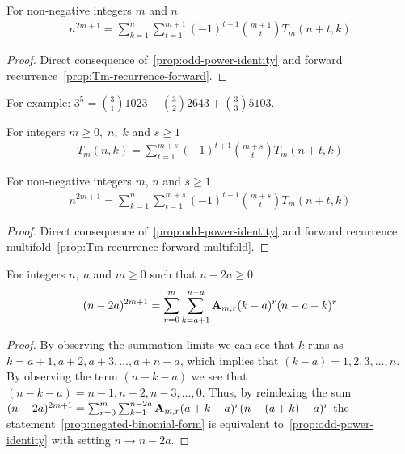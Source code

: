 \begin{proposition}
    \label{prop:odd-power-decomposition-forward}
    For non-negative integers $m$ and $n$
    \begin{align*}
        n^{2m+1} = \sum_{k=1}^{n} \sum_{t=1}^{m+1} (-1)^{t+1} \binom{m+1}{t} T_{m} (n+t, k)
    \end{align*}
    \begin{proof}
        Direct consequence of~\eqref{prop:odd-power-identity}
        and forward recurrence~\eqref{prop:Tm-recurrence-forward}.
    \end{proof}
\end{proposition}
For example: $3^5 = \binom{3}{1} 1023 - \binom{3}{2} 2643 + \binom{3}{3} 5103$.
\begin{proposition}
    For integers $m \geq 0, \; n, \; k$ and $s \geq 1$
    \label{prop:Tm-recurrence-forward-multifold}
    \begin{align*}
        T_{m} (n,k) = \sum_{t=1}^{m+s} (-1)^{t+1} \binom{m+s}{t} T_{m} (n+t, k)
    \end{align*}
\end{proposition}

\begin{proposition}
    \label{prop:odd-power-decomposition-forward-multifold}
    For non-negative integers $m$, $n$ and $s \geq 1$
    \begin{align*}
        n^{2m+1} = \sum_{k=1}^{n} \sum_{t=1}^{m+s} (-1)^{t+1} \binom{m+s}{t} T_{m} (n+t, k)
    \end{align*}
    \begin{proof}
        Direct consequence of~\eqref{prop:odd-power-identity}
        and forward recurrence multifold~\eqref{prop:Tm-recurrence-forward-multifold}.
    \end{proof}
\end{proposition}
\begin{proposition}
    \label{prop:negated-binomial-form}
    For integers $n, \; a$ and $m\geq 0$ such that $n-2a \geq 0$
    \begin{align*}
    (n-2a)^{2m+1} = \sum_{r=0}^{m} \sum_{k=a+1}^{n-a} {\mathbf{A}} \sb{m,r} (k-a)^r (n-a-k)^r
    \end{align*}
    \begin{proof}
        By observing the summation limits we can see that $k$ runs as $k=a+1,a+2,a+3,\ldots,a+n-a$, which
        implies that $(k-a)=1,2,3,\ldots, n$.
        By observing the term $(n-k-a)$ we see that $(n-k-a)=n-1,n-2,n-3,\ldots,0$.
        Thus, by reindexing the sum
        $(n-2a)^{2m+1} = \sum_{r=0}^{m} \sum_{k=1}^{n-2a} {\mathbf{A}} \sb{m,r} (a+k-a)^r (n-(a+k)-a)^r$
        the statement~\eqref{prop:negated-binomial-form} is equivalent to~\eqref{prop:odd-power-identity}
        with setting $n \rightarrow n-2a$.
    \end{proof}
\end{proposition}
